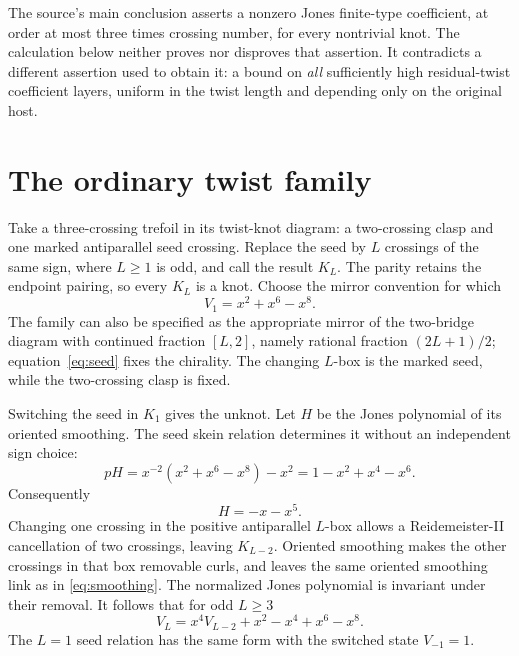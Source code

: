 \documentclass[11pt]{amsart}
\theoremstyle{remark}
\begin{document}
The source's main conclusion asserts a nonzero Jones finite-type
coefficient, at order at most three times crossing number, for
every nontrivial knot. The calculation below neither proves nor
disproves that assertion. It contradicts a different assertion
used to obtain it: a bound on \emph{all} sufficiently high
residual-twist coefficient layers, uniform in the twist length
and depending only on the original host.

\section{The ordinary twist family}\label{sec:family}

Take a three-crossing trefoil in its twist-knot diagram: a
two-crossing clasp and one marked antiparallel seed crossing.
Replace the seed by \(L\) crossings of the same sign, where
\(L\ge1\) is odd, and call the result \(K_L\).
The parity retains the endpoint pairing, so every \(K_L\)
is a knot. Choose the mirror convention for which
\begin{equation}\label{eq:seed}
 V_1=x^2+x^6-x^8.
\end{equation}
The family can also be specified as the appropriate mirror of
the two-bridge diagram with continued fraction \([L,2]\),
namely rational fraction \((2L+1)/2\);
equation~\eqref{eq:seed} fixes the chirality.
The changing \(L\)-box is the marked seed, while the
two-crossing clasp is fixed.

Switching the seed in \(K_1\) gives the unknot. Let \(H\)
be the Jones polynomial of its oriented smoothing.
The seed skein relation determines it without an independent
sign choice:
\[
 pH=x^{-2}(x^2+x^6-x^8)-x^2=1-x^2+x^4-x^6.
\]
Consequently
\begin{equation}\label{eq:smoothing}
 H=-x-x^5.
\end{equation}
Changing one crossing in the positive antiparallel \(L\)-box
allows a Reidemeister-II cancellation of two crossings,
leaving \(K_{L-2}\). Oriented smoothing makes the other
crossings in that box removable curls, and leaves the same
oriented smoothing link as in \eqref{eq:smoothing}.
The normalized Jones polynomial is invariant under their
removal. It follows that for odd \(L\ge3\)
\begin{equation}\label{eq:rec}
 V_L=x^4V_{L-2}+x^2-x^4+x^6-x^8.
\end{equation}
The \(L=1\) seed relation has the same form with the
switched state \(V_{-1}=1\).
\end{document}
